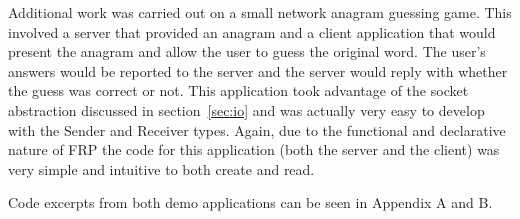     Additional work was carried out on a small network anagram guessing game. This involved a server that provided
    an anagram and a client application that would present the anagram and allow the user to guess the original
    word. The user's answers would be reported to the server and the server would reply with whether
    the guess was correct or not. This application took advantage of the socket abstraction discussed in section~\ref{sec:io}
    and was actually very easy to develop with the Sender and Receiver types. Again, due to the functional and
    declarative nature of FRP the code for this application (both the server and the client) was very simple
    and intuitive to both create and read.
    
    Code excerpts from both demo applications can be seen in Appendix A and B. 